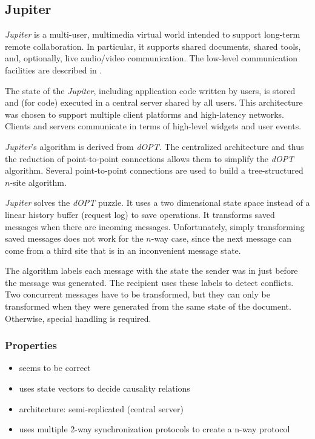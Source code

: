 \subsection{Jupiter}
\label{algo:jupiter}

\emph{Jupiter} is a multi-user, multimedia virtual world intended to support long-term remote collaboration. In particular, it supports shared documents, shared tools, and, optionally, live audio/video communication. The low-level communication facilities are described in \cite{jupiter95}.

The state of the \emph{Jupiter}, including application code written by users, is stored and (for code) executed in a central server shared by all users. This architecture was chosen to support multiple client platforms and high-latency networks. Clients and servers communicate in terms of high-level widgets and user events.

\emph{Jupiter}'s algorithm is derived from \emph{dOPT}. The centralized architecture and thus the reduction of point-to-point connections allows them to simplify the \emph{dOPT} algorithm. Several point-to-point connections are used to build a tree-structured $n$-site algorithm.

\emph{Jupiter} solves the \emph{dOPT} puzzle. It uses a two dimensional state space instead of a linear history buffer (request log) to save operations. It transforms saved messages when there are incoming messages. Unfortunately, simply transforming saved messages does not work for the $n$-way case, since the next message can come from a third site that is in an inconvenient message state.

The algorithm labels each message with the state the sender was in just before the message was generated. The recipient uses these labels to detect conflicts. Two concurrent messages have to be transformed, but they can only be transformed  when they were generated from the same state of the document. Otherwise, special handling is required.


\subsubsection{Properties}
\begin{itemize}
 \item seems to be correct
 \item uses state vectors to decide causality relations
 \item architecture: semi-replicated (central server)
 \item uses multiple 2-way synchronization protocols to create a n-way protocol
\end{itemize}
